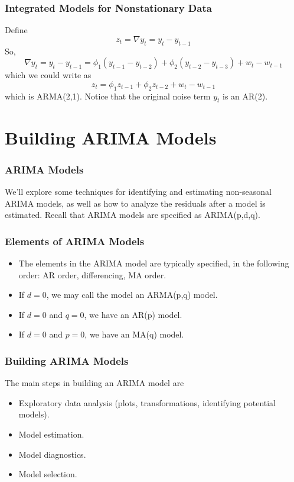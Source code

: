 \documentclass[%
xcolor=pdftex]{beamer}
\begin{document}
\begin{frame}
\frametitle{Integrated Models for Nonstationary Data}

Define
$$
z_t=\nabla y_t=y_t-y_{t-1}
$$
So,
$$
\nabla y_t=y_t-y_{t-1}=\phi_1 (y_{t-1}-y_{t-2})+\phi_2 (y_{t-2}-y_{t-3})+w_t-w_{t-1}
$$
which we could write as
$$
z_t=\phi_1 z_{t-1}+\phi_2 z_{t-2}+w_t-w_{t-1}
$$
which is ARMA(2,1). Notice that the original noise term $y_t$
is an AR(2).

\end{frame}

\section{Building ARIMA Models}
\frame{\tableofcontents[currentsection]}

\begin{frame}
\frametitle{ARIMA Models}

We'll explore some techniques for identifying and estimating non-seasonal ARIMA models, as well as how to analyze the residuals after a model is estimated. Recall that ARIMA models are specified as ARIMA(p,d,q).

\end{frame}

\begin{frame}
\frametitle{Elements of ARIMA Models}

\begin{itemize}
\item The elements in the ARIMA model are typically specified, in the following order: AR order, differencing, MA order.
\item If $d=0$, we may call the model an ARMA(p,q) model.
\item If $d=0$ and $q=0$, we have an AR(p) model.
\item If $d=0$ and $p=0$, we have an MA(q) model.
\end{itemize}

\end{frame}

\begin{frame}
\frametitle{Building ARIMA Models}

The main steps in building an ARIMA model are

\begin{itemize}
\item Exploratory data analysis (plots, transformations, identifying potential models).
\item Model estimation.
\item Model diagnostics.
\item Model selection.
\end{itemize}

\end{frame}
\end{document}
